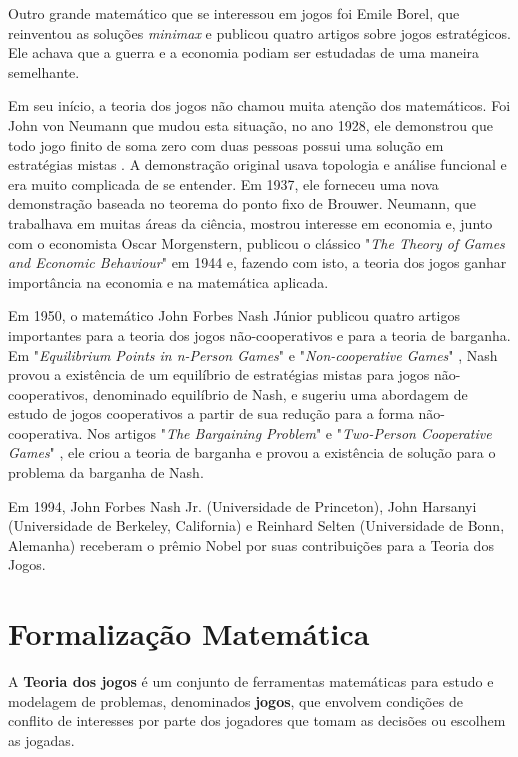 Outro grande matemático que se interessou em jogos foi Emile Borel, que reinventou as soluções \textit{minimax} e publicou quatro artigos sobre jogos estratégicos. Ele achava que a guerra e a economia podiam ser estudadas de uma maneira semelhante.

Em seu início, a teoria dos jogos não chamou muita atenção dos matemáticos. Foi John von Neumann que mudou esta situação, no ano 1928, ele demonstrou que todo jogo finito de soma zero com duas pessoas possui uma solução em estratégias mistas \cite{NEUMANN}. A demonstração original usava topologia e análise funcional e era muito complicada de se entender. Em 1937, ele forneceu uma nova demonstração baseada no teorema do ponto fixo de Brouwer. Neumann, que trabalhava em muitas áreas da ciência, mostrou interesse em economia e, junto com o economista Oscar Morgenstern, publicou o clássico "\textit{The Theory of Games and Economic Behaviour}" \cite{NEUMANN1} em 1944 e, fazendo com isto, a teoria dos jogos ganhar importância na economia e na matemática aplicada.

Em 1950, o matemático John Forbes Nash Júnior publicou quatro artigos importantes para a teoria dos jogos não-cooperativos e para a teoria de barganha. Em "\textit{Equilibrium Points in n-Person Games}" \cite{NASH} e "\textit{Non-cooperative Games}" \cite{NASH1}, Nash provou a existência de um equilíbrio de estratégias mistas para jogos não-cooperativos, denominado equilíbrio de Nash, e sugeriu uma abordagem de estudo de jogos cooperativos a partir de sua redução para a forma não-cooperativa. Nos artigos "\textit{The Bargaining Problem}" \cite{NASH2} e "\textit{Two-Person Cooperative Games}" \cite{NASH3}, ele criou a teoria de barganha e provou a existência de solução para o problema da barganha de Nash.

Em 1994, John Forbes Nash Jr. (Universidade de Princeton), John Harsanyi (Universidade de Berkeley, California) e Reinhard Selten (Universidade de Bonn, Alemanha) receberam o prêmio Nobel por suas contribuições para a Teoria dos Jogos.

\section{Formalização Matemática}

A \textbf{Teoria dos jogos} é um conjunto de ferramentas matemáticas para estudo e modelagem de problemas, denominados \textbf{jogos}, que envolvem condições de conflito de interesses por parte dos jogadores que tomam as decisões ou escolhem as jogadas. 

